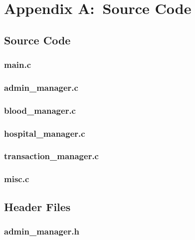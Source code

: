 \documentclass[12pt,a4paper]{report}
\begin{document}
\appendix
\chapter{Appendix A:\ Source Code}

\section{Source Code}
\subsection{main.c}


\subsection{admin\_manager.c}


\subsection{blood\_manager.c}


\subsection{hospital\_manager.c}


\subsection{transaction\_manager.c}


\subsection{misc.c}


\section{Header Files}
\subsection{admin\_manager.h}

\end{document}
